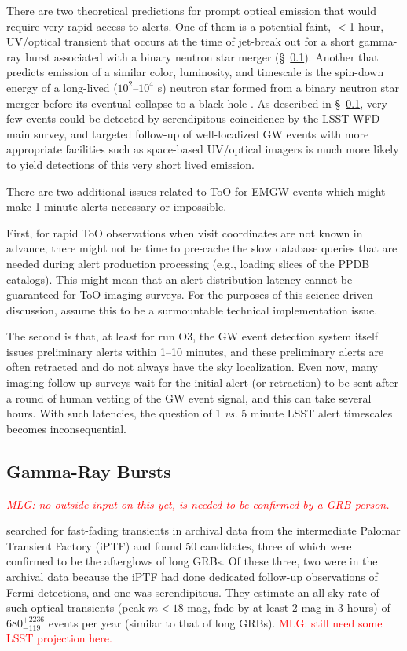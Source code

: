 \documentclass[DM,lsstdraft,authoryear,toc]{lsstdoc}
\begin{document}
There are two theoretical predictions for prompt optical emission that would require very rapid access to alerts.
One of them is a potential faint, $<$1 hour, UV/optical transient that occurs at the time of jet-break out for a short gamma-ray burst associated with a binary neutron star merger (\S~\ref{ssec:latency_grb}).
Another that predicts emission of a similar color, luminosity, and timescale is the spin-down energy of a long-lived ($10^2$--$10^4$ s) neutron star formed from a binary neutron star merger before its eventual collapse to a black hole \citep{2016ApJ...819...15S}.
As described in \S~\ref{ssec:latency_grb}, very few events could be detected by serendipitous coincidence by the LSST WFD main survey, and targeted follow-up of well-localized GW events with more appropriate facilities such as space-based UV/optical imagers is much more likely to yield detections of this very short lived emission.

There are two additional issues related to ToO for EMGW events which might make 1 minute alerts necessary or impossible. 

First, for rapid ToO observations when visit coordinates are not known in advance, there might not be time to pre-cache the slow database queries that are needed during alert production processing (e.g., loading slices of the PPDB catalogs).
This might mean that an alert distribution latency cannot be guaranteed for ToO imaging surveys. 
For the purposes of this science-driven discussion, assume this to be a surmountable technical implementation issue.

The second is that, at least for run O3, the GW event detection system itself issues preliminary alerts within 1--10 minutes, and these preliminary alerts are often retracted and do not always have the sky localization.
Even now, many imaging follow-up surveys wait for the initial alert (or retraction) to be sent after a round of human vetting of the GW event signal, and this can take several hours.
With such latencies, the question of 1 {\it vs.} 5 minute LSST alert timescales becomes inconsequential. 

\subsection{Gamma-Ray Bursts}\label{ssec:latency_grb}

{\it \textcolor{red}{MLG: no outside input on this yet, is needed to be confirmed by a GRB person.} }

\citet{2018ApJ...854L..13H} searched for fast-fading transients in archival data from the intermediate Palomar Transient Factory (iPTF) and found 50 candidates, three of which were confirmed to be the afterglows of long GRBs. Of these three, two were in the archival data because the iPTF had done dedicated follow-up observations of Fermi detections, and one was serendipitous. They estimate an all-sky rate of such optical transients (peak $m<18$ mag, fade by at least 2 mag in 3 hours) of $680^{+2236}_{-119}$ events per year (similar to that of long GRBs). \textcolor{red}{MLG: still need some LSST projection here.}
\end{document}
